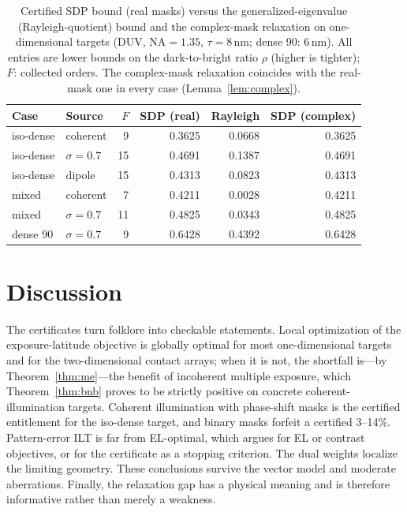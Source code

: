 \documentclass[11pt,a4paper]{article}
\newcommand{\SI}[2]{\ensuremath{#1\,\mathrm{#2}}}\newcommand{\SIrange}[3]{\ensuremath{#1\text{--}#2\,\mathrm{#3}}}
\newcommand{\NA}{\mathrm{NA}}
\begin{document}
\begin{table}[tbp]\centering\small
\caption{Certified SDP bound (real masks) versus the generalized-eigenvalue (Rayleigh-quotient) bound and the complex-mask relaxation on one-dimensional targets (DUV, $\NA=1.35$, $\tau=\SI{8}{nm}$; dense 90: \SI{6}{nm}). All entries are lower bounds on the dark-to-bright ratio $\rho$ (higher is tighter); $F$: collected orders. The complex-mask relaxation coincides with the real-mask one in every case (Lemma~\ref{lem:complex}).}\label{tab:rayleigh}
\begin{tabular}{@{}llrrrr@{}}\toprule
Case & Source & $F$ & SDP (real) & Rayleigh & SDP (complex)\\\midrule
iso-dense & coherent & 9 & 0.3625 & 0.0668 & 0.3625\\
iso-dense & $\sigma=0.7$ & 15 & 0.4691 & 0.1387 & 0.4691\\
iso-dense & dipole & 15 & 0.4313 & 0.0823 & 0.4313\\
mixed & coherent & 7 & 0.4211 & 0.0028 & 0.4211\\
mixed & $\sigma=0.7$ & 11 & 0.4825 & 0.0343 & 0.4825\\
dense 90 & $\sigma=0.7$ & 9 & 0.6428 & 0.4392 & 0.6428\\
\bottomrule\end{tabular}\end{table}

\FloatBarrier
\section{Discussion}
The certificates turn folklore into checkable statements. Local optimization of the exposure-latitude objective is globally optimal for most one-dimensional targets and for the two-dimensional contact arrays; when it is not, the shortfall is---by Theorem~\ref{thm:me}---the benefit of incoherent multiple exposure, which Theorem~\ref{thm:bnb} proves to be strictly positive on concrete coherent-illumination targets. Coherent illumination with phase-shift masks is the certified entitlement for the iso-dense target, and binary masks forfeit a certified 3--14\%. Pattern-error ILT is far from EL-optimal, which argues for EL or contrast objectives, or for the certificate as a stopping criterion. The dual weights localize the limiting geometry. These conclusions survive the vector model and moderate aberrations. Finally, the relaxation gap has a physical meaning and is therefore informative rather than merely a weakness.
\end{document}
